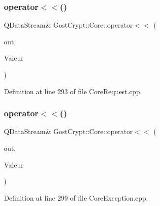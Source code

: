 \subsubsection{\texorpdfstring{operator$<$$<$()}{operator<<()}\hspace{0.1cm}{\footnotesize\ttfamily [54/56]}}
{\footnotesize\ttfamily Q\+Data\+Stream\& Gost\+Crypt\+::\+Core\+::operator$<$$<$ (\begin{DoxyParamCaption}\item[{Q\+Data\+Stream \&}]{out,  }\item[{const \hyperlink{struct_gost_crypt_1_1_core_1_1_restore_header_request}{Restore\+Header\+Request} \&}]{Valeur }\end{DoxyParamCaption})}



Definition at line 293 of file Core\+Request.\+cpp.

\mbox{\label{namespace_gost_crypt_1_1_core_a6b4cec660f52030cd478be0f0e738cbe}} 
\subsubsection{\texorpdfstring{operator$<$$<$()}{operator<<()}\hspace{0.1cm}{\footnotesize\ttfamily [55/56]}}
{\footnotesize\ttfamily Q\+Data\+Stream\& Gost\+Crypt\+::\+Core\+::operator$<$$<$ (\begin{DoxyParamCaption}\item[{Q\+Data\+Stream \&}]{out,  }\item[{const \hyperlink{class_gost_crypt_1_1_core_1_1_failed_using_system_random_source}{Gost\+Crypt\+::\+Core\+::\+Failed\+Using\+System\+Random\+Source} \&}]{Valeur }\end{DoxyParamCaption})}



Definition at line 299 of file Core\+Exception.\+cpp.

\mbox{\label{namespace_gost_crypt_1_1_core_aa6a7a985414a591b8cec54ea915c3f5a}} 
